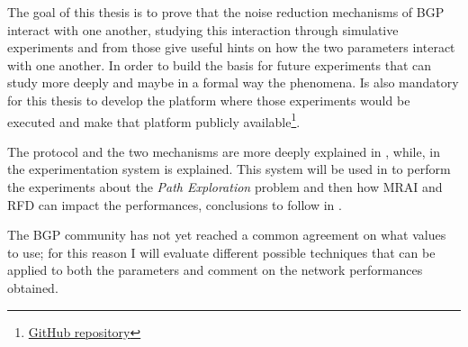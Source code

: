 
The goal of this thesis is to prove that the noise reduction mechanisms of \ac{BGP}
interact with one another, studying this interaction through simulative experiments
and from those give useful hints on how the two parameters interact with one another.
In order to build the basis for future experiments that can study more deeply
and maybe in a formal way the phenomena.
Is also mandatory for this thesis to develop the platform where those experiments
would be executed and make that platform publicly
available\footnote{\href{https://github.com/tiamilani/BGPFSM}{GitHub repository}}.

The protocol and the two mechanisms are more deeply explained in ,
while, in  the experimentation system is explained.
This system will be used in
to perform the experiments about the \textit{Path Exploration} problem and then
how \ac{MRAI} and \ac{RFD} can impact the performances, conclusions to follow
in .

The \ac{BGP} community has not yet reached a common agreement on what values
to use; for this reason I will evaluate different possible techniques that can
be applied to both the parameters and comment on the network performances obtained.

